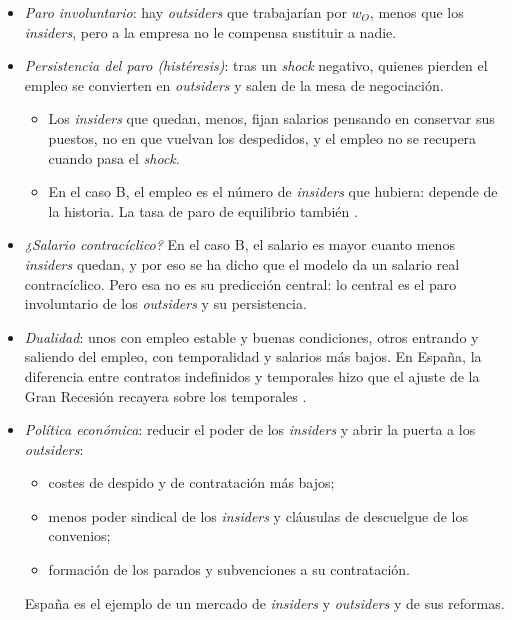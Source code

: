 \documentclass[11pt]{article}
\begin{document}
\begin{itemize}
\item \emph{Paro involuntario}: hay \emph{outsiders} que trabajarían por $w_O$, menos que los \emph{insiders}, pero a la empresa no le compensa sustituir a nadie.
\item \emph{Persistencia del paro (histéresis)}: tras un \emph{shock} negativo, quienes pierden el empleo se convierten en \emph{outsiders} y salen de la mesa de negociación.
  \begin{itemize}
  \item Los \emph{insiders} que quedan, menos, fijan salarios pensando en conservar sus puestos, no en que vuelvan los despedidos, y el empleo no se recupera cuando pasa el \emph{shock}.
  \item En el caso B, el empleo es el número de \emph{insiders} que hubiera: depende de la historia. La tasa de paro de equilibrio también\nocite{BlanchardSummers1986Hysteresis} .
  \end{itemize}
\item \emph{¿Salario contracíclico?} En el caso B, el salario es mayor cuanto menos \emph{insiders} quedan, y por eso se ha dicho que el modelo da un salario real contracíclico. Pero esa no es su predicción central: lo central es el paro involuntario de los \emph{outsiders} y su persistencia.
\item \emph{Dualidad}: unos con empleo estable y buenas condiciones, otros entrando y saliendo del empleo, con temporalidad y salarios más bajos. En España, la diferencia entre contratos indefinidos y temporales hizo que el ajuste de la Gran Recesión recayera sobre los temporales\nocite{BentolilaEtAl2012Two} .
\item \emph{Política económica}: reducir el poder de los \emph{insiders} y abrir la puerta a los \emph{outsiders}:
  \begin{itemize}
  \item costes de despido y de contratación más bajos;
  \item menos poder sindical de los \emph{insiders} y cláusulas de descuelgue de los convenios;
  \item formación de los parados y subvenciones a su contratación.
  \end{itemize}
  España es el ejemplo de un mercado de \emph{insiders} y \emph{outsiders} y de sus reformas\nocite{BentolilaDoladoJimeno2012Reforming}.
\end{itemize}

\end{document}
